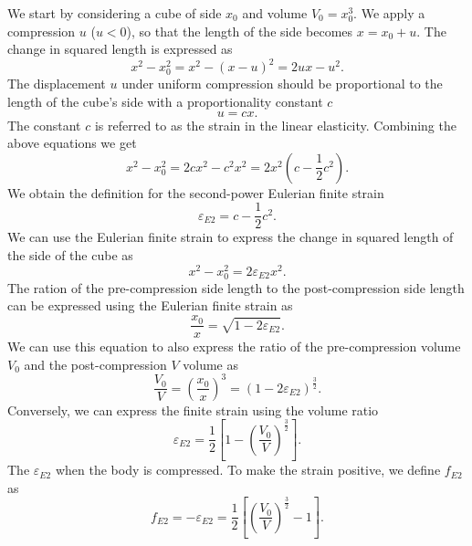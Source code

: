 We start by considering a cube of side $x_0$ and volume $V_0 = x_0^3$. We
apply a compression $u$ ($u < 0$), so that the length of the side becomes
$x = x_0 + u$. The change in squared length is expressed as
\begin{equation}
  x^2 - x_0^2 = x^2 - (x - u)^2 = 2ux - u^2.
\end{equation}
The displacement $u$ under uniform compression should be proportional to the
length of the cube's side with a proportionality constant $c$
\begin{equation}
  u = cx.
\end{equation}
The constant $c$ is referred to as the strain in the linear elasticity.
Combining the above equations we get
\begin{equation}
  x^2 - x_0^2 = 2cx^2 - c^2x^2 = 2x^2(c - \frac{1}{2}c^2).
\end{equation}
We obtain the definition for the second-power Eulerian finite strain
\begin{equation}
  \varepsilon_{E2} = c - \frac{1}{2}c^2.
\end{equation}
We can use the Eulerian finite strain to express the change in squared length
of the side of the cube as
\begin{equation}
  x^2 - x_0^2 = 2\varepsilon_{E2}x^2.
\end{equation}
The ration of the pre-compression side length to the post-compression side
length can be expressed using the Eulerian finite strain as
\begin{equation}
  \frac{x_0}{x} = \sqrt{1 - 2\varepsilon_{E2}}.
\end{equation}
We can use this equation to also express the ratio of the pre-compression
volume $V_0$ and the post-compression $V$ volume as
\begin{equation}
  \frac{V_0}{V} = \left(\frac{x_0}{x}\right)^3 =
  \left(1 - 2 \varepsilon_{E2}\right)^{\frac{3}{2}}.
\end{equation}
Conversely, we can express the finite strain using the volume ratio
\begin{equation}
  \varepsilon_{E2} = \frac{1}{2} \left[
    1 - \left(\frac{V_0}{V}\right)^{\frac{3}{2}}
  \right].
\end{equation}
The $\varepsilon_{E2}$ when the body is compressed. To make the strain
positive, we define $f_{E2}$ as
\begin{equation}
  f_{E2} = -\varepsilon_{E2} = \frac{1}{2} \left[
    \left(\frac{V_0}{V}\right)^{\frac{3}{2}} - 1
  \right].
  \label{eq:finite-strain}
\end{equation}
